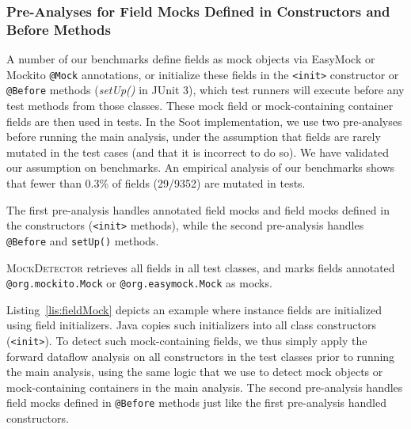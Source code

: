 \subsubsection{Pre-Analyses for Field Mocks Defined in Constructors and Before Methods}
\label{subsubsec:pre-analysis} A number of our benchmarks define fields as mock objects via EasyMock or Mockito \texttt{@Mock} annotations, or initialize these fields in the \texttt{<init>} constructor or \texttt{@Before} methods (\textit{setUp()} in JUnit 3), which test runners will execute before any test methods from those classes. These mock field or mock-containing container fields are then used in tests. In the Soot implementation, we use two pre-analyses before running the main analysis, under the assumption that fields are rarely mutated in the test cases (and that it is incorrect to do so). We have validated our assumption on benchmarks. An empirical analysis of our benchmarks shows that fewer than 0.3\% of fields (29/9352) are mutated in tests.

The first pre-analysis handles annotated field mocks and field mocks defined in the constructors (\texttt{<init>} methods), while the second pre-analysis handles \texttt{@Before} and \texttt{setUp()} methods. 

\textsc{MockDetector} retrieves all fields in all test classes, and marks fields annotated {\tt @org.mockito.Mock} or {\tt @org.easymock.Mock} as mocks.

Listing~\ref{lis:fieldMock} depicts an example where instance fields are initialized using field initializers. Java copies such initializers into all class constructors (\texttt{<init>}). To detect such mock-containing fields, we thus simply apply the forward dataflow analysis on all constructors in the test classes prior to running the main analysis, using the same logic that we use to detect mock objects or mock-containing containers in the main analysis. The second pre-analysis handles field mocks defined in \texttt{@Before} methods just like the first pre-analysis handled constructors.



